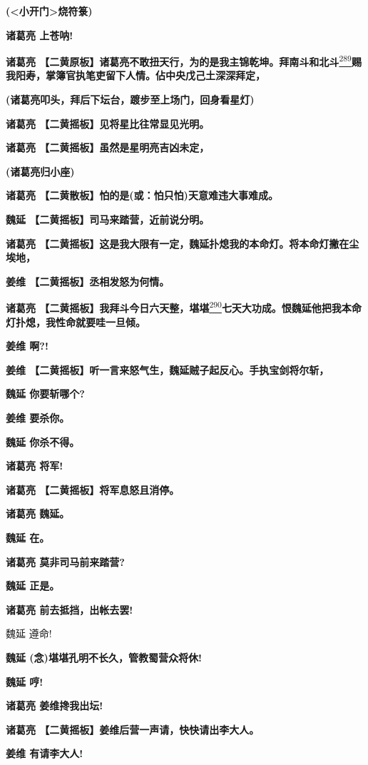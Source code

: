 \textbf{(\textless{}小开门\textgreater{}烧符箓)}

\textbf{诸葛亮 上苍呐!}

\textbf{诸葛亮
【二黄原板】诸葛亮不敢扭天行，为的是我主锦乾坤。拜南斗和北斗}\protect\hyperlink{fn289}{\textsuperscript{289}}\textbf{赐我阳寿，掌簿官执笔吏留下人情。佔中央戊己土深深拜定，}

\textbf{(诸葛亮叩头，拜后下坛台，踱步至上场门，回身看星灯)}

\textbf{诸葛亮 【二黄摇板】见将星比往常显见光明。}

\textbf{诸葛亮 【二黄摇板】虽然是星明亮吉凶未定，}

\textbf{(诸葛亮归小座)}

\textbf{诸葛亮 【二黄散板】怕的是(或：怕只怕)天意难违大事难成。}

\textbf{魏延 【二黄摇板】司马来踏营，近前说分明。}

\textbf{诸葛亮
【二黄摇板】这是我大限有一定，魏延扑熄我的本命灯。将本命灯撇在尘埃地，}

\textbf{姜维 【二黄摇板】丞相发怒为何情。}

\textbf{诸葛亮
【二黄摇板】我拜斗今日六天整，堪堪}\protect\hyperlink{fn290}{\textsuperscript{290}}\textbf{七天大功成。恨魏延他把我本命灯扑熄，我性命就要哇一旦倾。}

\textbf{姜维 啊?!}

\textbf{姜维
【二黄摇板】听一言来怒气生，魏延贼子起反心。手执宝剑将尔斩，}

\textbf{魏延 你要斩哪个?}

\textbf{姜维 要杀你。}

\textbf{魏延 你杀不得。}

\textbf{诸葛亮 将军!}

\textbf{诸葛亮 【二黄摇板】将军息怒且消停。}

\textbf{诸葛亮 魏延。}

\textbf{魏延 在。}

\textbf{诸葛亮 莫非司马前来踏营?}

\textbf{魏延 正是。}

\textbf{诸葛亮 前去抵挡，出帐去罢!}

魏延 遵命!

\textbf{魏延 (念)堪堪孔明不长久，管教蜀营众将休!}

\textbf{魏延 哼!}

\textbf{诸葛亮 姜维搀我出坛!}

\textbf{诸葛亮 【二黄摇板】姜维后营一声请，快快请出李大人。}

\textbf{姜维 有请李大人!}

